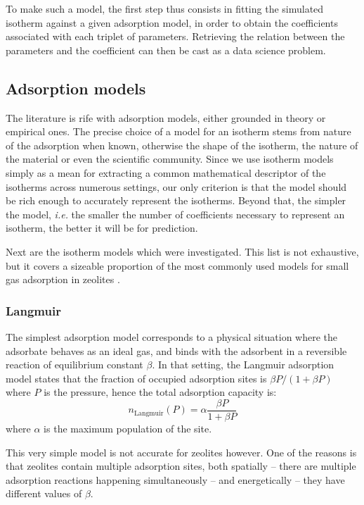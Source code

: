 \documentclass[main.tex]{subfiles}
\begin{document}
To make such a model, the first step thus consists in fitting the simulated isotherm against a given adsorption model, in order to obtain the coefficients associated with each triplet of parameters. Retrieving the relation between the parameters and the coefficient can then be cast as a data science problem.

\subsection{Adsorption models}

The literature is rife with adsorption models, either grounded in theory or empirical ones. The precise choice of a model for an isotherm stems from nature of the adsorption when known, otherwise the shape of the isotherm, the nature of the material or even the scientific community. Since we use isotherm models simply as a mean for extracting a common mathematical descriptor of the isotherms across numerous settings, our only criterion is that the model should be rich enough to accurately represent the isotherms. Beyond that, the simpler the model, \textit{i.e.} the smaller the number of coefficients necessary to represent an isotherm, the better it will be for prediction.

Next are the isotherm models which were investigated. This list is not exhaustive, but it covers a sizeable proportion of the most commonly used models for small gas adsorption in zeolites \autocite{AyaweiIsothermModels}.

\subsubsection{Langmuir}

The simplest adsorption model corresponds to a physical situation where the adsorbate behaves as an ideal gas, and binds with the adsorbent in a reversible reaction of equilibrium constant $\beta$. In that setting, the Langmuir adsorption model states that the fraction of occupied adsorption sites is $\beta P/(1+\beta P)$ where $P$ is the pressure, hence the total adsorption capacity is:
\[n_\text{Langmuir}(P) = \alpha\frac{\beta P}{1+\beta P}\]
where $\alpha$ is the maximum population of the site.

This very simple model is not accurate for zeolites however. One of the reasons is that zeolites contain multiple adsorption sites, both spatially -- there are multiple adsorption reactions happening simultaneously -- and energetically -- they have different values of $\beta$.
\end{document}
